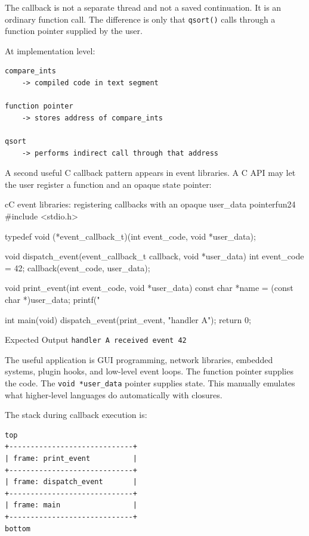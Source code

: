 \documentclass[a4paper,twoside]{report}
\begin{document}
The callback is not a separate thread and not a saved continuation. It is an ordinary function call. The difference is only that \texttt{qsort()} calls through a function pointer supplied by the user.

At implementation level:

\begin{verbatim}
compare_ints
    -> compiled code in text segment

function pointer
    -> stores address of compare_ints

qsort
    -> performs indirect call through that address
\end{verbatim}

A second useful C callback pattern appears in event libraries. A C API may let the user register a function and an opaque state pointer:

\begin{codebox}[]{c}{C event libraries: registering callbacks with an opaque user\_data pointer}{fun24}
#include <stdio.h>

typedef void (*event_callback_t)(int event_code, void *user_data);

void dispatch_event(event_callback_t callback, void *user_data) {
    int event_code = 42;
    callback(event_code, user_data);
}

void print_event(int event_code, void *user_data) {
    const char *name = (const char *)user_data;
    printf("%
}

int main(void) {
    dispatch_event(print_event, "handler A");
    return 0;
}
\end{codebox}


\begin{iobox}{Expected Output}
\texttt{handler A received event 42} \\
\end{iobox}



The useful application is GUI programming, network libraries, embedded systems, plugin hooks, and low-level event loops. The function pointer supplies the code. The \texttt{void *user\_data} pointer supplies state. This manually emulates what higher-level languages do automatically with closures.

The stack during callback execution is:

\begin{verbatim}
top
+-----------------------------+
| frame: print_event          |
+-----------------------------+
| frame: dispatch_event       |
+-----------------------------+
| frame: main                 |
+-----------------------------+
bottom
\end{verbatim}
\end{document}
